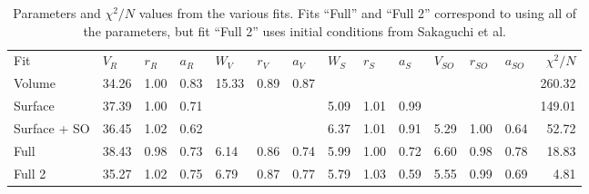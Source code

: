 \documentclass[aps, prc, twocolumn, reprint]{revtex4-1}
\begin{document}
\begin{table}[h]
\begin{ruledtabular}
\begin{tabular}{lllllllllllllr}
Fit          & $V_R$ & $r_R$ & $a_R$ & $W_V$ & $r_V$ & $a_V$ & $W_S$ & $r_S$ & $a_S$ & $V_{SO}$ & $r_{SO}$ & $a_{SO}$ & $\chi^2/N$ \\
\colrule
Volume       & 34.26 & 1.00  & 0.83  & 15.33 & 0.89  & 0.87  &       &       &       &          &          &          & 260.32     \\
Surface      & 37.39 & 1.00  & 0.71  &       &       &       & 5.09  & 1.01  & 0.99  &          &          &          & 149.01     \\
Surface + SO & 36.45 & 1.02  & 0.62  &       &       &       & 6.37  & 1.01  & 0.91  & 5.29     & 1.00     & 0.64     & 52.72      \\
Full         & 38.43 & 0.98  & 0.73  & 6.14  & 0.86  & 0.74  & 5.99  & 1.00  & 0.72  & 6.60     & 0.98     & 0.78     & 18.83      \\
Full 2       & 35.27 & 1.02  & 0.75  & 6.79  & 0.87  & 0.77  & 5.79  & 1.03  & 0.59  & 5.55     & 0.99     & 0.69     & 4.81      
\end{tabular}
\end{ruledtabular}

\caption{Parameters and $\chi^2/N$ values from the various fits. Fits ``Full'' and ``Full 2'' correspond to using all of the parameters, but fit ``Full 2'' uses initial conditions from Sakaguchi et al. \cite{Sakaguchi1982}}
\label{tab:params}

\end{table}



\end{document}
